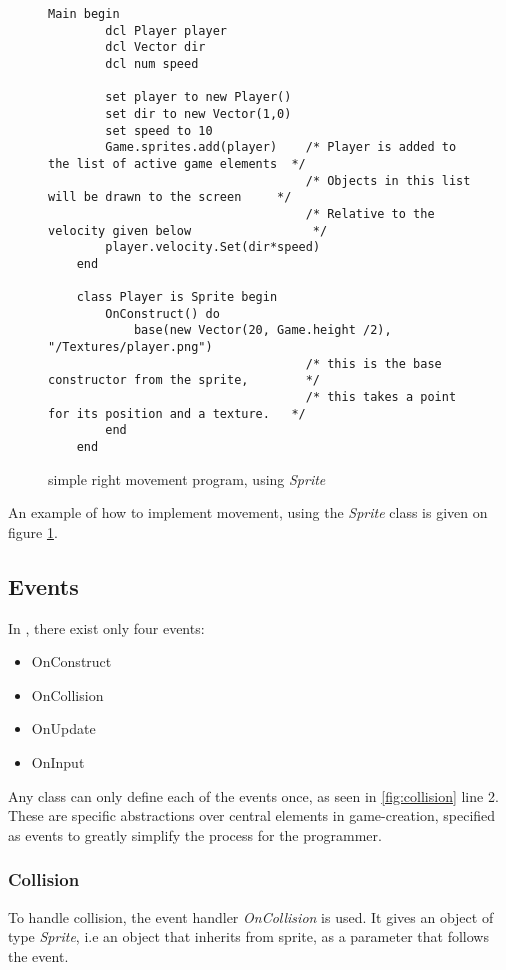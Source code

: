 \begin{figure}[H]
    \centering
    
    \begin{lstlisting}[style=gglang]
    Main begin
        dcl Player player
        dcl Vector dir
        dcl num speed
        
        set player to new Player()
        set dir to new Vector(1,0)
        set speed to 10
        Game.sprites.add(player)    /* Player is added to the list of active game elements  */
                                    /* Objects in this list will be drawn to the screen     */
                                    /* Relative to the velocity given below                 */
        player.velocity.Set(dir*speed)
    end
    
    class Player is Sprite begin
        OnConstruct() do 
            base(new Vector(20, Game.height /2), "/Textures/player.png")
                                    /* this is the base constructor from the sprite,        */
                                    /* this takes a point for its position and a texture.   */
        end
    end
    \end{lstlisting}
    \caption{simple right movement program, using \textit{Sprite}\label{fig:sprite}}
\end{figure}

An example of how to implement movement, using the \textit{Sprite} class is given on figure \ref{fig:sprite}.

\subsection{Events}
In \lang{}, there exist only four events:
\begin{itemize}
    \item OnConstruct
    \item OnCollision
    \item OnUpdate
    \item OnInput
\end{itemize}

Any class can only define each of the events once, as seen in \ref{fig:collision} line 2. These are specific abstractions over central elements in game-creation, specified as events to greatly simplify the process for the programmer.
\subsubsection{Collision}
To handle collision, the event handler \textit{OnCollision} is used. It gives an object of type \textit{Sprite}, i.e an object that inherits from sprite, as a parameter that follows the event.

